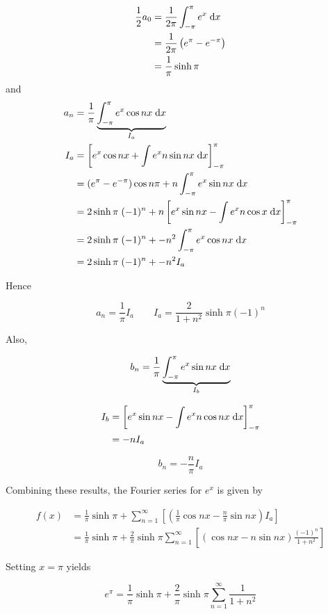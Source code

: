 \documentclass[a4paper]{article}
\begin{document}
\begin{align*}
\frac{1}{2} a_{0} & = \frac{1}{2\pi} \int_{-\pi}^{\pi} e^{x} \; \mathrm{d} x \\
& = \frac{1}{2\pi} \left(  e^{\pi} - e^{-\pi} \right) \\
& = \frac{1}{\pi} \sinh \pi
\end{align*}
and 
\begin{align*}
a_{n} & = \frac{1}{\pi} \underbrace{ \int_{-\pi}^{\pi} e^{x} \cos n x \; \mathrm{d} x}_{I_{a}}  \\
I_{a} & =  \left[   e^{x} \cos n x + \int e^{x} n \sin n x  \; \mathrm{d} x  \right]_{-\pi}^{\pi} \\
& = (e^{\pi} - e^{-\pi}  )\cos n \pi + n \int_{-\pi}^{\pi} e^{x} \sin n x \;\mathrm{d} x \\
& = 2 \sinh \pi \;  (-1)^{n} + n \left[  e^{x} \sin n x - \int e^{x} n \cos x \; \mathrm{d} x  \right]_{-\pi}^{\pi} \\
& =  2 \sinh \pi \;  (-1)^{n} + -n^{2} \int_{-\pi}^{\pi} e^{x} \cos n x \; \mathrm{d} x \\
& =  2 \sinh \pi \;  (-1)^{n} + -n^{2} I_{a}
\end{align*}

Hence 

\[ a_{n} = \frac{1}{\pi} I_{a} \qquad I_{a} = \frac{2}{1 + n^{2}} \sinh \pi (-1)^{n} \]

Also,

\[ b_{n} =  \frac{1}{\pi} \underbrace{\int_{-\pi}^{\pi}  e^{x} \sin n x \; \mathrm{d} x }_{I_{b}} \]

\begin{align*}
I_{b} & = \left[  e^{x} \sin n x - \int e^{x} n \cos n x \; \mathrm{d} x  \right]_{-\pi}^{\pi}  \\
& = -n I_{a}
\end{align*}

\[ b_{n} = - \frac{n}{\pi} I_{a} \]

Combining these results, the Fourier series for $ e^{x} $ is given by

\begin{align*}
f(x) & = \frac{1}{\pi} \sinh \pi  + \sum_{n=1}^{\infty} \left[  \left(  \frac{1}{\pi} \cos n x - \frac{n}{\pi} \sin n x \right) I_{a}  \right]  \\
& = \frac{1}{\pi} \sinh \pi + \frac{2}{\pi} \sinh \pi \sum_{n=1}^{\infty} \left[  (\cos n x - n \sin n x) \frac{(-1)^{n}}{1+n^{2}} \right] 
\end{align*}

Setting $ x = \pi $ yields

\[ e^{\pi} = \frac{1}{\pi} \sinh \pi + \frac{2}{\pi} \sinh \pi \sum_{n=1}^{\infty} \frac{1}{1+n^{2}} \]
\end{document}
